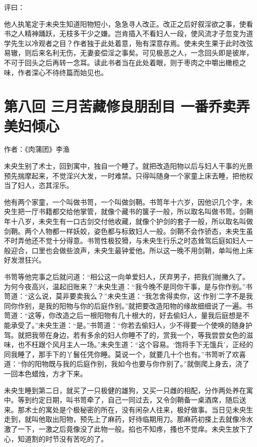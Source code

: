 \documentclass[a4paper,12pt,UTF8,twoside]{ctexbook}
\begin{document}
评曰：

他人执笔定于未央生知道阳物短小，急急寻人改正。改正之后好叙淫欲之事，使看书之人精神踊跃，无枝多干少之嫌。岂肯插入不看妇人一段，使风流才子忽变为道学先生以冷观者之目？作者独于此处着意，殆有深意存焉。使未央生果于此时改弦易辙，则后来名利无伤，无妻妾偿淫之事矣。可见极恶之人，一念回头即是彼岸，不可于回头之后再转一念耳。读此书者当在此处着眼，则于枣肉之中嚼出橄榄之味，作者深心不待终篇而始见也。

\chapter{第八回 三月苦藏修良朋刮目 一番乔卖弄美妇倾心}

作者：《肉蒲团》李渔

未央生别了术士，回到寓中，独自一个睡了。就把改造阳物以后与妇人干事的光景预先揣摩起来，不觉淫兴大发，一时难禁。只得叫随身一个家童上床去睡，把他权当了妇人，恣其淫乐。

他有两个家童，一个叫做书笥，一个叫做剑鞘。书笥年十六岁，因他识几个字，未央生把一厅书籍都交给他掌管，就像个藏书的箧子一般，所以取名叫做书笥。剑鞘年十八岁，未央生有一口古剑交付他收藏，就像个护剑的套子一般，所以取名叫做剑鞘。两个人物都一样妖姣，姿色都与标致妇人一般。剑鞘不会作骄态，未央生虽不时弄他还不觉十分得意。书笥性极狡猾，与未央生行乐之时态耸驾后庭如妇人一般迎合，口里也会做些浪声，未央生最钟爱他。所以这一晚不用剑鞘，单叫他上床好发泄狂兴。

书笥等他完事之后就问道：“相公这一向单爱妇人，厌弃男子，把我们抛撇久了。为何今夜高兴，温起旧账来？”未央生道：“我今晚不是同你干事，是与你作别。”书笥道：“这么说，莫非要卖我么？”未央生道：“我怎舍得卖你，这‘作别’二字不是我同你作别，是我的阳物与你的后庭作别。”就把要改造阳物的缘故细细说了一遍。书笥道：“这等，你改造之后一根阳物有几十根大的，好去偷妇人，量我后庭想是不能承受了。”未央生道：“是。”书笥道：“你若去偷妇人，少不得要一个使唤的随身护驾。就把我带在身边，若有多余的妇人你睡不了的，赏我一个，等我尝尝女色的滋味，也不枉跟个风月主人一场。”未央生道：“这个容易。‘饱将手下无饿兵’，正经的同我睡了，那手下的丫鬟任凭你睡。莫说一个，就要几十个也有。”书笥听了欢喜道：“你的阳物既与我的后庭作别，我如今也要与你作别了。”就倒爬上身去，浇了一回本色蜡烛，方才下来。

未央生睡到第二日，就买了一只极健的雄狗，又买一只雌的相配，分作两处养在寓中。等到约定日期，叫书笥牵了，自己一同过去，又令剑鞘备一桌酒席，随后送来。那术士的寓处是个极秘密的所在，没有闲杂人往来，极好做事。当日见未央生走到，就叫他取出阳物，预先上了麻药，好待临期用刀。那麻药初搽上去就像冷水激了一下，一激之后竟像没了此物一般。掐也不知疼，搔也不觉痒。未央生放下了心，知道割的时节没有苦吃的了。
\end{document}
